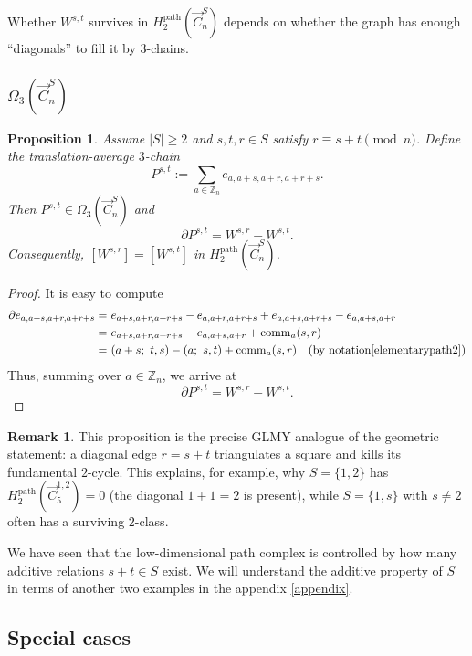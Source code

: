 \documentclass[11pt]{amsart}
\newcommand{\Z}{\mathbb Z}
\theoremstyle{plain}
\newtheorem{proposition}[theorem]{Proposition}
\theoremstyle{definition}
\newtheorem{remark}[theorem]{Remark}
\numberwithin{equation}{section}
\begin{document}
Whether $W^{s,t}$ survives in $H_2^{\mathrm{path}}(\vec{C}_n^S)$ depends on whether the graph has enough ``diagonals'' to fill it by $3$-chains.

\subsubsection{\texorpdfstring{$\Omega_3(\vec{C}_n^S)$}{Omega3}}

\begin{proposition}\label{prop:P}
Assume $|S|\geq2$ and  $s,t,r\in S$ satisfy $r\equiv s+t\pmod n$. Define the translation-average $3$-chain
\[
P^{s,t}:=\sum_{a\in\mathbb Z_n}e_{a,a+s,a+r,a+r+s}.
\]
Then $P^{s,t}\in \Omega_3(\vec{C}_n^S)$ and
\[
\partial P^{s,t}= W^{s,r}-W^{s,t}.
\]
Consequently, $[W^{s,r}]=[W^{s,t}]$ in $H_2^{\mathrm{path}}(\vec{C}_n^S)$.  
\end{proposition}

\begin{proof}
It is easy to compute
\begin{align*}
\partial e_{a,a+s,a+r,a+r+s}=~&e_{a+s,a+r,a+r+s}-e_{a,a+r,a+r+s}+e_{a,a+s,a+r+s}-e_{a,a+s,a+r}\\
=~&e_{a+s,a+r,a+r+s}-e_{a,a+s,a+r}+\operatorname{comm}_a(s,r)\\
=~&(a+s;~t,s)-(a;~s,t)+\operatorname{comm}_a(s,r)\quad (\text{by notation} \eqref{elementarypath2})
\end{align*}
Thus, summing over $a\in\Z_n$, we arrive at
\[\partial P^{s,t}= W^{s,r}-W^{s,t}.\]
\end{proof}


\begin{remark}
This proposition is the precise GLMY analogue of the geometric statement:
a diagonal edge $r=s+t$ triangulates a square and kills its fundamental $2$-cycle.
This explains, for example, why $S=\{1,2\}$ has $H_2^{\mathrm{path}}(\vec{C}_5^{1,2})=0$ (the diagonal $1+1=2$ is present),
while $S=\{1,s\}$ with $s\neq 2$ often has a surviving $2$-class.
\end{remark}



We have seen that the low-dimensional path complex is controlled by how many additive relations $s+t\in S$ exist. We will understand the additive property of $S$ in terms of another two examples in the appendix \ref{appendix}.


 


\subsection{Special cases}\label{sub:special}
\end{document}
